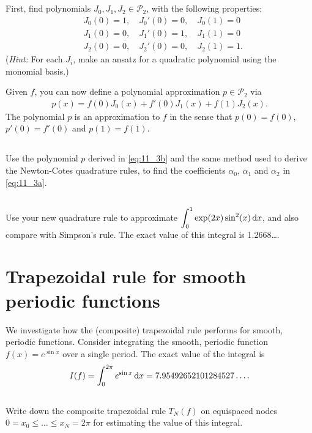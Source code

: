 \documentclass[11pt,letterpaper]{article}
\begin{document}
\subsection{}
First, find polynomials $J_0, J_1, J_2 \in \mathcal{P}_2$, with the
  following properties:
  \begin{align*}
    & J_0(0)=1,\quad J_0'(0)=0,\quad J_0(1)=0\\
    & J_1(0)=0,\quad J_1'(0)=1,\quad J_1(1)=0\\
    & J_2(0)=0,\quad J_2'(0)=0,\quad J_2(1)=1.
  \end{align*}
  ({\em Hint:} For each $J_i$, make an ansatz for a quadratic polynomial using the monomial basis.)

Given $f$, you can now define a polynomial approximation $p\in \mathcal{P}_2$ via 
\begin{align}
    p(x)=f(0)J_0(x)+f'(0)J_1(x)+f(1)J_2(x). \label{eq:11_3b}
\end{align}
The polynomial $p$ is an approximation to $f$ in the sense that
$p(0)=f(0)$, $p'(0)=f'(0)$ and $p(1)=f(1)$. 

\subsection{}
Use the polynomial
  $p$ derived in \eqref{eq:11_3b} and the same method used to derive the Newton-Cotes
  quadrature rules, to find the coefficients $\alpha_0$, $\alpha_1$ and
  $\alpha_2$ in \eqref{eq:11_3a}.
  
\subsection{}
Use your new quadrature rule to approximate
  $\displaystyle{\int_0^1\exp(2x)\sin^2(x)\,\mathrm{d}x}$, and also compare with
  Simpson's rule. The exact value of this integral is 1.2668\dots.


\section{Trapezoidal rule for smooth periodic functions}

We investigate how the (composite) trapezoidal rule performs for smooth, periodic functions. Consider integrating the smooth, periodic function $f(x) = e^{\sin x}$ over a single period. The exact value of the integral is
\[
I(f) = \int_0^{2\pi} e^{\sin x} \, \mathrm{d} x = 7.95492652101284527\dots.
\]

\subsection{}
Write down the composite trapezoidal rule $T_N(f)$ on equispaced nodes $0=x_0 \le  \dots \le x_N = 2\pi$ for estimating the value of this integral. 
\end{document}
